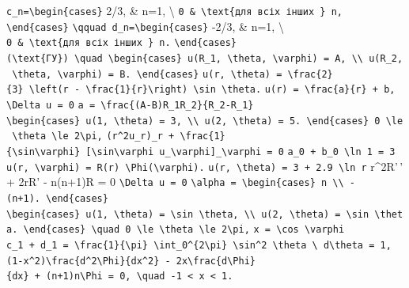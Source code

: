 \documentclass[
  ukrainian,
]{article}
\begin{document}
\texttt{c\_n=\textbackslash{}begin\{cases\}} 2/3, \& n=1,
\textbackslash{}
\texttt{0\ \&\ \textbackslash{}text\{для\ всіх\ інших\ \}\ n,}
\texttt{\textbackslash{}end\{cases\}}
\texttt{\textbackslash{}qquad\ d\_n=\textbackslash{}begin\{cases\}}
-2/3, \& n=1, \textbackslash{}
\texttt{0\ \&\ \textbackslash{}text\{для\ всіх\ інших\ \}\ n.}
\texttt{\textbackslash{}end\{cases\}}
\texttt{(\textbackslash{}text\{ГУ\})\ \textbackslash{}quad\ \textbackslash{}begin\{cases\}\ u(R\_1,\ \textbackslash{}theta,\ \textbackslash{}varphi)\ =\ A,\ \textbackslash{}\textbackslash{}\ u(R\_2,\ \textbackslash{}theta,\ \textbackslash{}varphi)\ =\ B.\ \textbackslash{}end\{cases\}}
\texttt{u(r,\ \textbackslash{}theta)\ =\ \textbackslash{}frac\{2\}\{3\}\ \textbackslash{}left(r\ -\ \textbackslash{}frac\{1\}\{r\}\textbackslash{}right)\ \textbackslash{}sin\ \textbackslash{}theta.}
\texttt{u(r)\ =\ \textbackslash{}frac\{a\}\{r\}\ +\ b,}
\texttt{\textbackslash{}Delta\ u\ =\ 0}
\texttt{a\ =\ \textbackslash{}frac\{(A-B)R\_1R\_2\}\{R\_2-R\_1\}}
\texttt{\textbackslash{}begin\{cases\}\ u(1,\ \textbackslash{}theta)\ =\ 3,\ \textbackslash{}\textbackslash{}\ u(2,\ \textbackslash{}theta)\ =\ 5.\ \textbackslash{}end\{cases\}\ 0\ \textbackslash{}le\ \textbackslash{}theta\ \textbackslash{}le\ 2\textbackslash{}pi,}
\texttt{(r\^{}2u\_r)\_r\ +\ \textbackslash{}frac\{1\}\{\textbackslash{}sin\textbackslash{}varphi\}\ {[}\textbackslash{}sin\textbackslash{}varphi\ u\_\textbackslash{}varphi{]}\_\textbackslash{}varphi\ =\ 0}
\texttt{a\_0\ +\ b\_0\ \textbackslash{}ln\ 1\ =\ 3}
\texttt{u(r,\ \textbackslash{}varphi)\ =\ R(r)\ \textbackslash{}Phi(\textbackslash{}varphi).}
\texttt{u(r,\ \textbackslash{}theta)\ =\ 3\ +\ 2.9\ \textbackslash{}ln\ r}
r\^{}2R'\,' + 2rR' - n(n+1)R = 0 \texttt{\textbackslash{}Delta\ u\ =\ 0}
\texttt{\textbackslash{}alpha\ =\ \textbackslash{}begin\{cases\}\ n\ \textbackslash{}\textbackslash{}\ -(n+1).\ \textbackslash{}end\{cases\}}
\texttt{\textbackslash{}begin\{cases\}\ u(1,\ \textbackslash{}theta)\ =\ \textbackslash{}sin\ \textbackslash{}theta,\ \textbackslash{}\textbackslash{}\ u(2,\ \textbackslash{}theta)\ =\ \textbackslash{}sin\ \textbackslash{}theta.\ \textbackslash{}end\{cases\}\ \textbackslash{}quad\ 0\ \textbackslash{}le\ \textbackslash{}theta\ \textbackslash{}le\ 2\textbackslash{}pi,}
\texttt{x\ =\ \textbackslash{}cos\ \textbackslash{}varphi}
\texttt{c\_1\ +\ d\_1\ =\ \textbackslash{}frac\{1\}\{\textbackslash{}pi\}\ \textbackslash{}int\_0\^{}\{2\textbackslash{}pi\}\ \textbackslash{}sin\^{}2\ \textbackslash{}theta\ \textbackslash{}\ d\textbackslash{}theta\ =\ 1,}
\texttt{(1-x\^{}2)\textbackslash{}frac\{d\^{}2\textbackslash{}Phi\}\{dx\^{}2\}\ -\ 2x\textbackslash{}frac\{d\textbackslash{}Phi\}\{dx\}\ +\ (n+1)n\textbackslash{}Phi\ =\ 0,\ \textbackslash{}quad\ -1\ \textless{}\ x\ \textless{}\ 1.}
\end{document}

